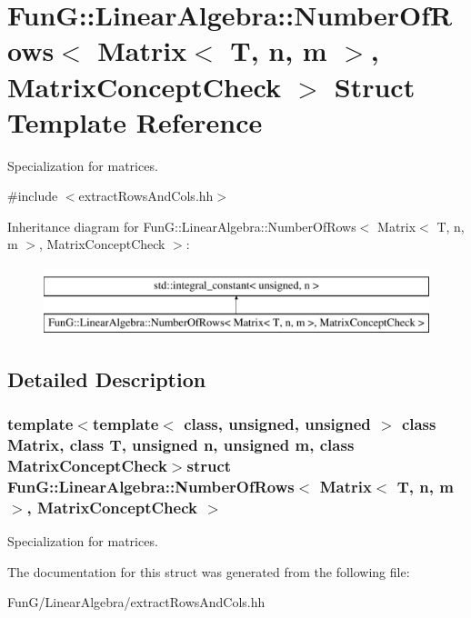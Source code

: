 \hypertarget{structFunG_1_1LinearAlgebra_1_1NumberOfRows_3_01Matrix_3_01T_00_01n_00_01m_01_4_00_01MatrixConceptCheck_01_4}{\section{Fun\-G\-:\-:Linear\-Algebra\-:\-:Number\-Of\-Rows$<$ Matrix$<$ T, n, m $>$, Matrix\-Concept\-Check $>$ Struct Template Reference}
\label{structFunG_1_1LinearAlgebra_1_1NumberOfRows_3_01Matrix_3_01T_00_01n_00_01m_01_4_00_01MatrixConceptCheck_01_4}
}


Specialization for matrices.  




{\ttfamily \#include $<$extract\-Rows\-And\-Cols.\-hh$>$}

Inheritance diagram for Fun\-G\-:\-:Linear\-Algebra\-:\-:Number\-Of\-Rows$<$ Matrix$<$ T, n, m $>$, Matrix\-Concept\-Check $>$\-:\begin{figure}[H]
\begin{center}
\leavevmode
\includegraphics[height=2.000000cm]{structFunG_1_1LinearAlgebra_1_1NumberOfRows_3_01Matrix_3_01T_00_01n_00_01m_01_4_00_01MatrixConceptCheck_01_4}
\end{center}
\end{figure}


\subsection{Detailed Description}
\subsubsection*{template$<$template$<$ class, unsigned, unsigned $>$ class Matrix, class T, unsigned n, unsigned m, class Matrix\-Concept\-Check$>$struct Fun\-G\-::\-Linear\-Algebra\-::\-Number\-Of\-Rows$<$ Matrix$<$ T, n, m $>$, Matrix\-Concept\-Check $>$}

Specialization for matrices. 

The documentation for this struct was generated from the following file\-:\begin{DoxyCompactItemize}
\item 
Fun\-G/\-Linear\-Algebra/extract\-Rows\-And\-Cols.\-hh\end{DoxyCompactItemize}

